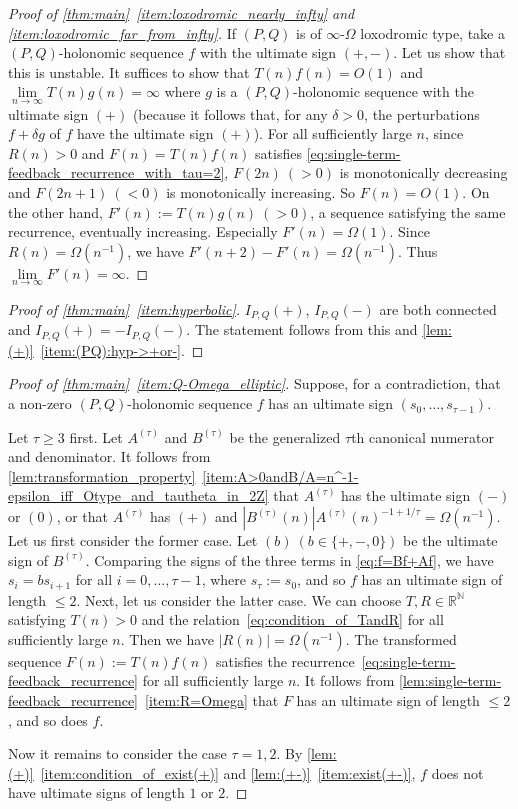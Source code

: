 \documentclass[a4paper,UKenglish,cleveref,autoref,thm-restate]{lipics-v2021}
\newcommand{\R}{\mathbb{R}}
\newcommand{\N}{\mathbb{N}}
\begin{document}
\begin{proof}[Proof of \cref{thm:main}~\eqref{item:loxodromic_nearly_infty} and \eqref{item:loxodromic_far_from_infty}]
If $(P, Q)$ is of $\infty$-$\Omega$ loxodromic type, take a $(P, Q)$-holonomic sequence $f$ with the ultimate sign $(+, -)$. 
Let us show that this is unstable. It suffices to show that $T(n)f(n) = O(1)$ and $\lim\limits_{n \to \infty}T(n)g(n) = \infty$ where $g$ is a $(P, Q)$-holonomic sequence with the ultimate sign $(+)$ (because it follows that, for any $\delta > 0$, the perturbations $f + \delta g$ of $f$ have the ultimate sign $(+)$). For all sufficiently large $n$, since $R(n) > 0$ and $F(n) = T(n)f(n)$ satisfies \cref{eq:single-term-feedback_recurrence_with_tau=2}, $F(2n) \ (> 0)$ is monotonically decreasing and $F(2n+1) \ (< 0)$ is monotonically increasing. 
So $F(n) = O(1)$. On the other hand, $F'(n) := T(n)g(n) \ (>0)$, a sequence satisfying the same recurrence, eventually increasing. Especially $F'(n) = \Omega(1)$. Since $R(n) = \Omega(n^{-1})$, we have $F'(n+2) - F'(n) = \Omega(n^{-1})$. 
Thus $\lim\limits_{n \to \infty} F'(n) = \infty$. 
\end{proof}

\begin{proof}[Proof of \cref{thm:main}~\eqref{item:hyperbolic}]
$I_{P, Q}(+)$, $I_{P, Q}(-)$ are both connected and $I_{P, Q}(+) = -I_{P, Q}(-)$. The statement follows from this and \cref{lem:(+)}~\eqref{item:(PQ):hyp->+or-}. 
\end{proof}

\begin{proof}[Proof of \cref{thm:main}~\eqref{item:Q-Omega_elliptic}]
Suppose, for a contradiction, that a non-zero $(P, Q)$-holonomic sequence $f$ has an ultimate sign $(s_0, \dots, s_{\tau-1})$. 

Let $\tau \geq 3$ first. Let $A^{(\tau)}$ and $B^{(\tau)}$ be the generalized $\tau$th canonical numerator and denominator. It follows from \cref{lem:transformation_property}~\eqref{item:A>0andB/A=n^-1-epsilon_iff_Otype_and_tautheta_in_2Z} that $A^{(\tau)}$ has the ultimate sign $(-)$ or $(0)$, or that $A^{(\tau)}$ has $(+)$ and $|B^{(\tau)}(n)|  A^{(\tau)} (n)^{-1+1/\tau} = \Omega(n^{-1})$. 
Let us first consider the former case. 
Let $(b) \ (b \in \{+, -, 0 \})$ be the ultimate sign of $B^{(\tau)}$. 
Comparing the signs of the three terms in \cref{eq:f=Bf+Af}, we have $s_i = b s_{i+1}$ for all $i = 0, \dots, \tau-1$, where $s_{\tau} := s_0$, and so $f$ has an ultimate sign of length $\leq 2$. 
Next, let us consider the latter case. 
We can choose $T, R \in \R^{\N}$ satisfying $T(n) > 0$ and the relation~\eqref{eq:condition_of_TandR} for all sufficiently large $n$. Then we have $|R(n)| = \Omega(n^{-1})$. 
The transformed sequence $F(n) := T(n)f(n)$ satisfies the recurrence~\eqref{eq:single-term-feedback_recurrence} for all sufficiently large $n$. 
It follows from \cref{lem:single-term-feedback_recurrence}~\eqref{item:R=Omega} that $F$ has an ultimate sign of length $\leq 2$, and so does $f$. 

Now it remains to consider the case $\tau = 1, 2$. By \cref{lem:(+)}~\eqref{item:condition_of_exist(+)} and \cref{lem:(+-)}~\eqref{item:exist(+-)}, $f$ does not have ultimate signs of length $1$ or $2$. 
\end{proof}
\end{document}
